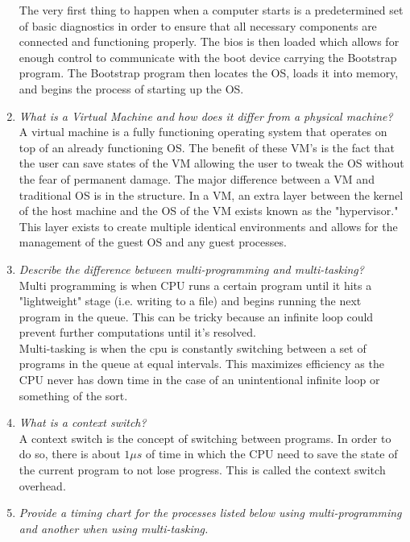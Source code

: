 \documentclass[12pt]{article}
\begin{document}
\begin{enumerate}
	The very first thing to happen when a computer starts is a predetermined set of basic diagnostics in order to ensure that all necessary components are connected and functioning properly. The bios is then loaded which allows for enough control to communicate with the boot device carrying the Bootstrap program. The Bootstrap program then locates the OS, loads it into memory, and begins the process of starting up the OS.
	\item \textit{What is a Virtual Machine and how does it differ from a physical machine?}\\
	A virtual machine is a fully functioning operating system that operates on top of an already functioning OS. The benefit of these VM's is the fact that the user can save states of the VM allowing the user to tweak the OS without the fear of permanent damage. The major difference between a VM and traditional OS is in the structure. In a VM, an extra layer between the kernel of the host machine and the OS of the VM exists known as the "hypervisor." This layer exists to create multiple identical environments and allows for the management of the guest OS and any guest processes.
\newpage
	\item \textit{Describe the difference between multi-programming and multi-tasking?}\\
	Multi programming is when CPU runs a certain program until it hits a "lightweight" stage (i.e. writing to a file) and begins running the next program in the queue. This can be tricky because an infinite loop could prevent further computations until it's resolved.\\
	Multi-tasking is when the cpu is constantly switching between a set of programs in the queue at equal intervals. This maximizes efficiency as the CPU never has down time in the case of an unintentional infinite loop or something of the sort.
	\item \textit{What is a context switch?}\\
	A context switch is the concept of switching between programs. In order to do so, there is about $1\mu s$ of time in which the CPU need to save the state of the current program to not lose progress. This is called the context switch overhead.
	\item \textit{Provide a timing chart for the processes listed below using multi-programming and another when using multi-tasking.}

\end{enumerate}
\end{document}
